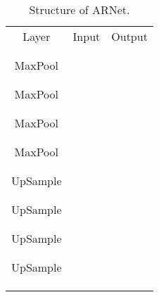 \documentclass[journal]{IEEEtran}
\begin{document}
\renewcommand \arraystretch{0.9}
\begin{table}[tbph]
  \centering
  \footnotesize
  \caption{Structure of ARNet.}
  \label{tal:ARNet}
     \begin{tabular}{ccc}
      \toprule
      Layer & Input & Output\\
      \cmidrule(lr){1-1}\cmidrule(lr){2-2}\cmidrule(lr){3-3}
       &  & \\
       &  & \\ 
      MaxPool &  &  \\
       &  & \\ 
       &  & \\ 
      MaxPool &  &  \\
       &  & \\ 
       &  & \\ 
      MaxPool &  &  \\
       &  & \\ 
       &  & \\ 
      MaxPool &  &  \\
       &  & \\ 
       &  & \\ 
      UpSample &  &  \\
       &  & \\ 
       &  & \\ 
      UpSample &  &  \\
       &  & \\ 
       &  & \\ 
      UpSample &  &  \\
       &  & \\ 
       &  & \\ 
      UpSample &  &  \\
       &  & \\ 
       &  & \\ 

       &  & \\ 
      \bottomrule
    \end{tabular}
\end{table}
\end{document}
